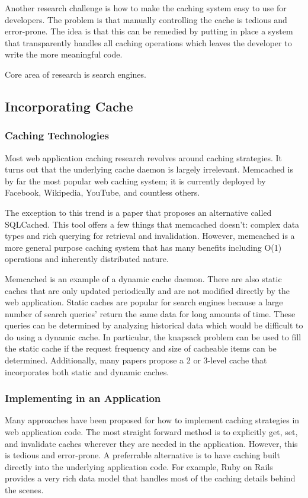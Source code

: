\documentclass[12pt]{article}
\begin{document}
Another research challenge is how to make the caching system easy to use for developers.
The problem is that manually controlling the cache is tedious and error-prone.
The idea is that this can be remedied by putting in place a system that transparently handles all caching operations which leaves the developer to write the more meaningful code.

Core area of research is search engines. %

\subsection{Incorporating Cache}
\subsubsection{Caching Technologies}
Most web application caching research revolves around caching strategies.
It turns out that the underlying cache daemon is largely irrelevant.
Memcached is by far the most popular web caching system; it is currently deployed by Facebook, Wikipedia, YouTube, and countless others.\cite{memcachedDotOrg}

The exception to this trend is a paper that proposes an alternative called SQLCached.\cite{sqlCached}
This tool offers a few things that memcached doesn't: complex data types and rich querying for retrieval and invalidation.
However, memcached is a more general purpose caching system that has many benefits including O(1) operations and inherently distributed nature.\cite{memcachedDotOrg}

Memcached is an example of a dynamic cache daemon.
There are also static caches that are only updated periodically and are not modified directly by the web application.
Static caches are popular for search engines because a large number of search queries' return the same data for long amounts of time.
These queries can be determined by analyzing historical data which would be difficult to do using a dynamic cache.\cite{designTradeOffsSearchEngine}
In particular, the knapsack problem can be used to fill the static cache if the request frequency and size of cacheable items can be determined.\cite{designTradeOffsSearchEngine}
Additionally, many papers propose a 2 or 3-level cache that incorporates both static and dynamic caches.\cite{cacheAdmissionPolicies}\cite{designTradeOffsSearchEngine}

\subsubsection{Implementing in an Application}
Many approaches have been proposed for how to implement caching strategies in web application code.
The most straight forward method is to explicitly get, set, and invalidate caches wherever they are needed in the application.
However, this is tedious and error-prone.\cite{keyBasedCacheExpiration}\cite{triggerBasedORM}
A preferrable alternative is to have caching built directly into the underlying application code.
For example, Ruby on Rails provides a very rich data model that handles most of the caching details behind the scenes.\cite{keyBasedCacheExpiration}
\end{document}
